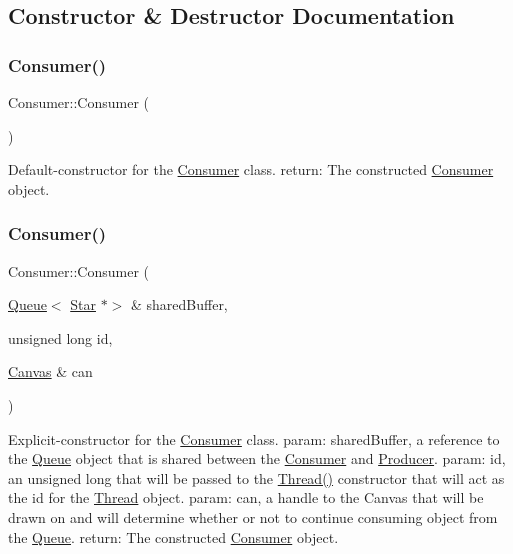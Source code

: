 \subsection{Constructor \& Destructor Documentation}
\mbox{\label{class_consumer_a31a7b4bc675d04c877269a5da93b981a}} 
\subsubsection{\texorpdfstring{Consumer()}{Consumer()}\hspace{0.1cm}{\footnotesize\ttfamily [1/2]}}
{\footnotesize\ttfamily Consumer\+::\+Consumer (\begin{DoxyParamCaption}{ }\end{DoxyParamCaption})}

Default-\/constructor for the \hyperlink{class_consumer}{Consumer} class. return\+: The constructed \hyperlink{class_consumer}{Consumer} object. \mbox{\label{class_consumer_a8297e8de091856b95132502fa4a4ab44}} 
\subsubsection{\texorpdfstring{Consumer()}{Consumer()}\hspace{0.1cm}{\footnotesize\ttfamily [2/2]}}
{\footnotesize\ttfamily Consumer\+::\+Consumer (\begin{DoxyParamCaption}\item[{\hyperlink{class_queue}{Queue}$<$ \hyperlink{classtsgl_1_1_star}{Star} $\ast$$>$ \&}]{shared\+Buffer,  }\item[{unsigned long}]{id,  }\item[{\hyperlink{classtsgl_1_1_canvas}{Canvas} \&}]{can }\end{DoxyParamCaption})}

Explicit-\/constructor for the \hyperlink{class_consumer}{Consumer} class. param\+: shared\+Buffer, a reference to the \hyperlink{class_queue}{Queue} object that is shared between the \hyperlink{class_consumer}{Consumer} and \hyperlink{class_producer}{Producer}. param\+: id, an unsigned long that will be passed to the \hyperlink{class_thread_a95c703fb8f2f27cb64f475a8c940864a}{Thread()} constructor that will act as the id for the \hyperlink{class_thread}{Thread} object. param\+: can, a handle to the Canvas that will be drawn on and will determine whether or not to continue consuming object from the \hyperlink{class_queue}{Queue}. return\+: The constructed \hyperlink{class_consumer}{Consumer} object. 

